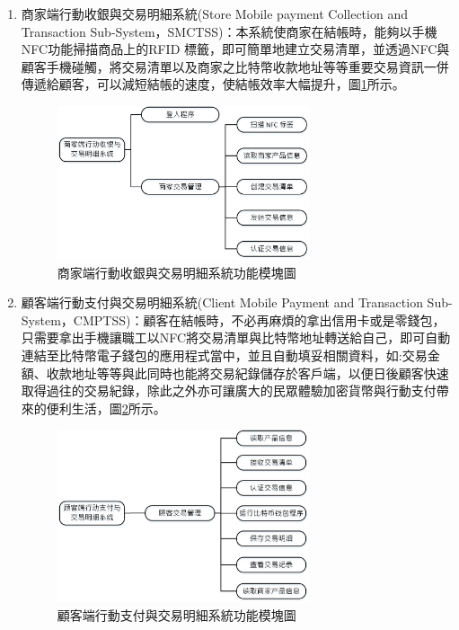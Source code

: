\begin{enumerate}
		\item 商家端行動收銀與交易明細系統(Store Mobile payment Collection and Transaction Sub-System，SMCTSS)：本系統使商家在結帳時，能夠以手機NFC功能掃描商品上的RFID 標籤，即可簡單地建立交易清單，並透過NFC與顧客手機碰觸，將交易清單以及商家之比特幣收款地址等等重要交易資訊一併傳遞給顧客，可以減短結帳的速度，使結帳效率大幅提升，圖\ref{model3}所示。
		 
			\begin{figure}[!htbp]
			\centering
			\includegraphics[width = 0.7\textwidth]{model3.jpg}
			\caption{商家端行動收銀與交易明細系統功能模塊圖}\label{model3}
			\end{figure}


		\item 顧客端行動支付與交易明細系統(Client Mobile Payment and Transaction Sub-System，CMPTSS)：顧客在結帳時，不必再麻煩的拿出信用卡或是零錢包，只需要拿出手機讓職工以NFC將交易清單與比特幣地址轉送給自己，即可自動連結至比特幣電子錢包的應用程式當中，並且自動填妥相關資料，如:交易金額、收款地址等等與此同時也能將交易紀錄儲存於客戶端，以便日後顧客快速取得過往的交易紀錄，除此之外亦可讓廣大的民眾體驗加密貨幣與行動支付帶來的便利生活，圖\ref{model2}所示。
			\begin{figure}[!htbp]
			\centering
			\includegraphics[width = 0.7\textwidth]{model2.jpg}
			\caption{顧客端行動支付與交易明細系統功能模塊圖}\label{model2}
			\end{figure}
		
	\end{enumerate}
	

